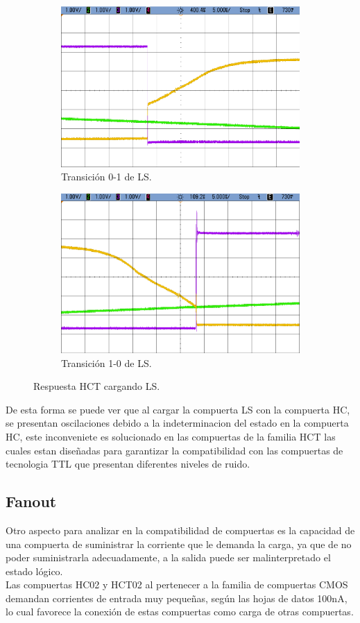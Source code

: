\begin{figure}[H]
\begin{subfigure}{.5\textwidth}
  \centering
  \includegraphics[width=.8\linewidth]{figs/EJ2/LS_HCT_0_1.png}  
  \caption{Transici\'on 0-1 de LS.}
  \label{ej2_fig:LS_HCT_01}
\end{subfigure}
\begin{subfigure}{.5\textwidth}
  \centering
  \includegraphics[width=.8\linewidth]{figs/EJ2/LS_HCT_1_0.png}  
  \caption{Transici\'on 1-0 de LS.}
  \label{ej2_fig:LS_HCT_10}
\end{subfigure}
\caption{Respuesta HCT cargando LS.}
\label{ej2_fig:LS_HCT}
\end{figure}

De esta forma se puede ver que al cargar la compuerta LS con la compuerta HC, se presentan oscilaciones debido a la indeterminacion del estado en la compuerta HC, este inconveniete es solucionado en las compuertas de la familia HCT las cuales estan diseñadas para garantizar la compatibilidad con las compuertas de tecnologia TTL que presentan diferentes niveles de ruido.\\
\subsection{Fanout}
Otro aspecto para analizar en la compatibilidad de compuertas es la capacidad de una compuerta de suministrar la corriente que le demanda la carga, ya que de no poder suministrarla adecuadamente, a la salida puede ser malinterpretado el estado l\'ogico.\\
Las compuertas HC02 y HCT02 al pertenecer a la familia de compuertas CMOS demandan corrientes de entrada muy pequeñas, seg\'un las hojas de datos 100nA, lo cual favorece la conexi\'on de estas compuertas como carga de otras compuertas.

